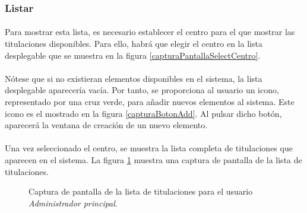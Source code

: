\subsubsection{Listar}

  \paragraph{}Para mostrar esta lista, es necesario establecer el centro para
  el que mostrar las titulaciones disponibles. Para ello, habrá que elegir el
  centro en la lista desplegable que se muestra en la figura
  \ref{capturaPantallaSelectCentro}.

  \paragraph{}Nótese que si no existieran elementos disponibles en el sistema,
  la lista desplegable aparecería vacía. Por tanto, se proporciona al usuario
  un icono, representado por una cruz verde, para añadir nuevos elementos al
  sistema. Este icono es el mostrado en la figura \ref{capturaBotonAdd}. Al
  pulsar dicho botón, aparecerá la ventana de creación de un nuevo elemento.

  \paragraph{}Una vez seleccionado el centro, se muestra la lista completa de
  titulaciones que aparecen en el sistema. La figura
  \ref{capturaPantallaListaTitulacionesAdminPrincipal} muestra
  una captura de pantalla de la lista de titulaciones.

  \begin{figure}[!ht]
    \begin{center}
      \caption{Captura de pantalla de la lista de titulaciones para el usuario \textit{Administrador principal}.}
      \label{capturaPantallaListaTitulacionesAdminPrincipal}
    \end{center}
  \end{figure}
